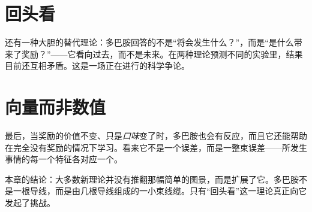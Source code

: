 \section*{回头看}

还有一种大胆的替代理论：多巴胺回答的不是“将会发生什么？”，而是“是什么带来了奖励？”——它看向过去，而不是未来。在两种理论预测不同的实验里，结果目前还互相矛盾。这是一场正在进行的科学争论。

\section*{向量而非数值}

最后，当奖励的价值不变、只是\emph{口味}变了时，多巴胺也会有反应，而且它还能帮助在完全没有奖励的情况下学习。看来它不是一个误差，而是一整束误差——所发生事情的每一个特征各对应一个。

本章的结论：大多数新理论并没有推翻那幅简单的图景，而是扩展了它。多巴胺不是一根导线，而是由几根导线组成的一小束线缆。只有“回头看”这一理论真正向它发起了挑战。

